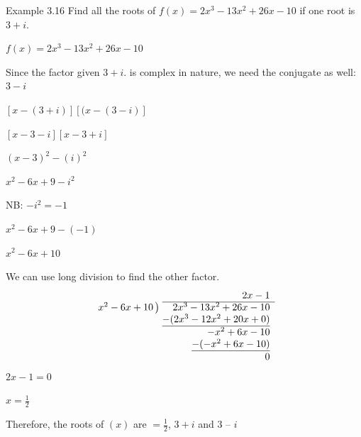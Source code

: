 \begin{example}{Example 3.16}
Find all the roots of $f(x) = 2x^3 - 13x^2 + 26x - 10$ if one root is $3 + i$.

\solution
$f(x) = 2x^3 - 13x^2 + 26x - 10$

Since the factor given $3 + i$. is complex in nature, we need the conjugate as well:
$3 - i$

$[x - (3 + i)][(x - (3 - i)]$

$[x - 3 - i][x - 3 + i]$

$(x - 3)^2 - (i)^2$

$x^2 - 6x + 9 - i^2$

NB: $-i^2 = -1$

$x^2 - 6x + 9 - (-1)$

$x^2 - 6x + 10$

We can use long division to find the other factor.
\[
\begin{array}{r@{\;}r}
 & 2x - 1 \\ \cline{2-2}
x^2 - 6x + 10\,\big) & 2x^3 - 13x^2 + 26x - 10 \\
 & \underline{-(2x^3 - 12x^2 + 20x + 0)} \\
 & -x^2 + 6x - 10 \\
 & \underline{-(-x^2 + 6x - 10)} \\
 & 0
\end{array}
\]
$2x - 1 = 0$

$x = \frac{1}{2}$

Therefore, the roots of $(x)$ are $= \frac{1}{2}$, $3 + i$ and $3$ -- $i$
\end{example}
